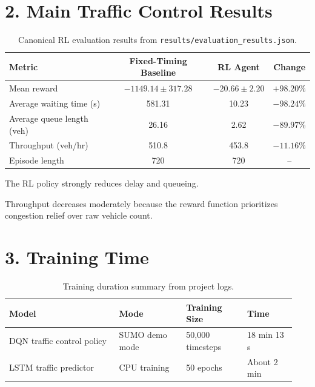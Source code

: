 \documentclass[11pt,a4paper]{article}
\begin{document}
\section*{2. Main Traffic Control Results}
\begin{table}[h!]
\centering
\caption{Canonical RL evaluation results from \texttt{results/evaluation\_results.json}.}
\begin{threeparttable}
\begin{tabular}{lccc}
\toprule
\textbf{Metric} & \textbf{Fixed-Timing Baseline} & \textbf{RL Agent} & \textbf{Change} \\
\midrule
Mean reward & $-1149.14 \pm 317.28$ & $-20.66 \pm 2.20$ & $+98.20\%$ \\
Average waiting time (s) & 581.31 & 10.23 & $-98.24\%$ \\
Average queue length (veh) & 26.16 & 2.62 & $-89.97\%$ \\
Throughput (veh/hr) & 510.8 & 453.8 & $-11.16\%$ \\
Episode length & 720 & 720 & -- \\
\bottomrule
\end{tabular}
\begin{tablenotes}
\footnotesize
\item The RL policy strongly reduces delay and queueing.
\item Throughput decreases moderately because the reward function prioritizes congestion relief over raw vehicle count.
\end{tablenotes}
\end{threeparttable}
\end{table}

\section*{3. Training Time}
\begin{table}[h!]
\centering
\caption{Training duration summary from project logs.}
\begin{tabular}{p{0.36\linewidth} p{0.22\linewidth} p{0.20\linewidth} p{0.16\linewidth}}
\toprule
\textbf{Model} & \textbf{Mode} & \textbf{Training Size} & \textbf{Time} \\
\midrule
DQN traffic control policy & SUMO demo mode & 50{,}000 timesteps & 18 min 13 s \\
LSTM traffic predictor & CPU training & 50 epochs & About 2 min \\
\bottomrule
\end{tabular}
\end{table}
\end{document}
